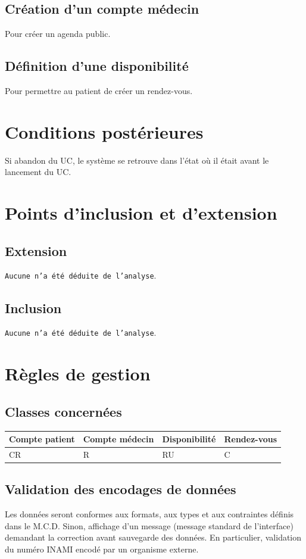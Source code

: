 \subsection{Création d'un compte médecin}
Pour créer un agenda public.
\subsection{Définition d'une disponibilité}
Pour permettre au patient de créer un rendez-vous.

\section{Conditions postérieures}
Si abandon du UC, le système se retrouve dans l’état où il était avant le
lancement du UC.
\newpage

\section{Points d'inclusion et d'extension}
\subsection{Extension}
\texttt{Aucune n'a été déduite de l'analyse}.
\subsection{Inclusion}
\texttt{Aucune n'a été déduite de l'analyse}.
\newpage

\section{Règles de gestion}
\subsection{Classes concernées}
\begin{center}
	\begin{longtable}{|p{2.2cm}|p{2.2cm}|p{2.2cm}|p{2.2cm}|}
		\hline
		 Compte patient & Compte médecin & Disponibilité & Rendez-vous \\
		\hline
		 CR & R & RU & C \\
		\hline
	\end{longtable}
\end{center}
\subsection{Validation des encodages de données}
Les données seront conformes aux formats, aux types et aux contraintes définis
dans le M.C.D. Sinon, affichage d’un message (message standard de l’interface) 
demandant la correction avant sauvegarde des données.
En particulier, validation du numéro INAMI encodé par un organisme externe.

